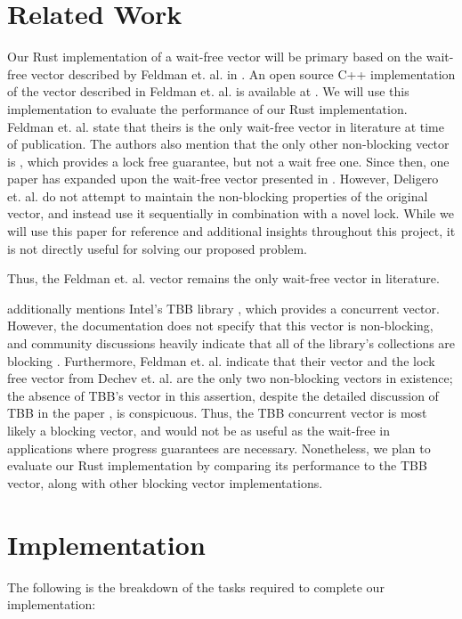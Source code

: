 \documentclass[conference]{IEEEtran}
\begin{document}
\section{Related Work}

Our Rust implementation of a wait-free vector will be primary based on the wait-free vector described by Feldman et. al. in \cite{main}. An open source C++ implementation of the vector described in Feldman et. al. \cite{main} is available at \cite{cpp}. We will use this implementation to evaluate the performance of our Rust implementation.
Feldman et. al. \cite{main} state that theirs is the only wait-free vector in literature at time of publication. The authors \cite{main} also mention that the only other non-blocking vector is \cite{lfvec}, which provides a lock free guarantee, but not a wait free one. Since then, one paper \cite{mrlock} has expanded upon the wait-free vector presented in \cite{main}. However, Deligero et. al. \cite{mrlock} do not attempt to maintain the non-blocking properties of the original vector, and instead use it sequentially in combination with a novel lock. While we will use this paper for reference and additional insights throughout this project, it is not directly useful for solving our proposed problem. 

Thus, the Feldman et. al. \cite{main} vector remains the only wait-free vector in literature.

\cite{main} additionally mentions Intel’s TBB library \cite{tbb}, which provides a concurrent vector. However, the documentation does not specify that this vector is non-blocking, and community discussions heavily indicate that all of the library’s collections are blocking \cite{tbbcomm}. Furthermore, Feldman et. al. \cite{main} indicate that their vector and the lock free vector from Dechev et. al. \cite{lfvec} are the only two non-blocking vectors in existence; the absence of TBB’s vector in this assertion, despite the detailed discussion of TBB in the paper \cite{main}, is conspicuous. Thus, the TBB concurrent vector is most likely a blocking vector, and would not be as useful as the wait-free in applications where progress guarantees are necessary. Nonetheless, we plan to evaluate our Rust implementation by comparing its performance to the TBB vector, along with other blocking vector implementations. 



\section{Implementation}
The following is the breakdown of the tasks required to complete our implementation:
\end{document}
